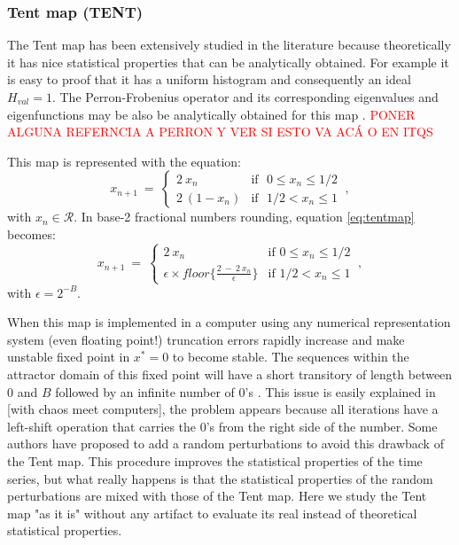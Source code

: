 \subsubsection{Tent map (TENT)} \label{sssec:tent}

The Tent map has been extensively studied in the literature because theoretically it has nice statistical properties that can be analytically obtained.
For example it is easy to proof that it has a uniform histogram and consequently an ideal $H_{val}=1$.
The Perron-Frobenius operator and its corresponding eigenvalues and eigenfunctions may be also be analytically obtained for this map \cite{tent}.
\textcolor{red}{PONER ALGUNA REFERNCIA A PERRON Y VER SI ESTO VA ACÁ O EN ITQS}

This map is represented with the equation:
\begin{equation}\label{eq:tentmap}
x_{n+1}~=~ \left\{ \begin{array}{ll}
2~{x_n} & \textrm{if ~$0\leq x_n\leq 1/2$}\\
2~(1-{x_n}) & \textrm{if ~$1/2<x_n\leq 1$} 
\end{array} \right.  \ ,
\end{equation}
with $x_n\in\mathcal{R}$.
In base-2 fractional numbers rounding, equation \ref{eq:tentmap} becomes:
\begin{equation}\label{eq:tentdecbin}
x_{n+1}~=~ \left\{ \begin{array}{ll}
2~{x_n} & \textrm{if $0\leq x_n\leq 1/2$}\\
\epsilon \times floor\{\frac{2~-~2~x_n}{\epsilon}\} & \textrm{if $1/2<x_n\leq 1$} 
\end{array} \right.  \ ,
\end{equation}
with $\epsilon=2^{-B}$.

When this map is implemented in a computer using any numerical representation system (even floating point!) truncation errors rapidly increase and make unstable fixed point in $x^*=0$ to become stable.
The sequences within the attractor domain of this fixed point will have a short transitory of length between $0$ and $B$ followed by an infinite number of  $0$'s \cite{Jessa1993,Callegari1997}.
This issue is easily explained in [with chaos meet computers], the problem appears because all iterations have a left-shift operation that carries the $0$'s from the right side of the number.
Some authors \cite{buscar} have proposed to add a random perturbations to avoid this drawback of the Tent map.
This procedure improves the statistical properties of the time series, but what really happens is that the statistical properties of the random perturbations are mixed with those of the Tent map.
Here we study the Tent map "as it is" without any artifact to evaluate its real instead of theoretical statistical properties. 

